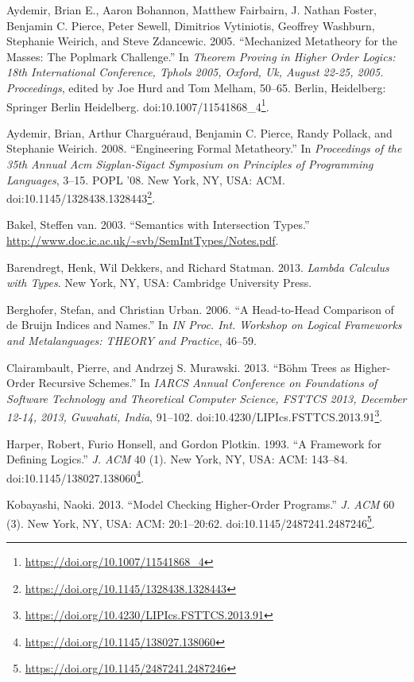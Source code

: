\documentclass[a4paper, 12pt, twoside]{style/ociamthesis}
\theoremstyle{plain}
\theoremstyle{definition}
\theoremstyle{remark}
\renewcommand{\href}[2]{#2\footnote{\url{#1}}}
\begin{document}
\hypertarget{refs}{}
\hypertarget{ref-aydemir05}{}
Aydemir, Brian E., Aaron Bohannon, Matthew Fairbairn, J. Nathan Foster,
Benjamin C. Pierce, Peter Sewell, Dimitrios Vytiniotis, Geoffrey
Washburn, Stephanie Weirich, and Steve Zdancewic. 2005. ``Mechanized
Metatheory for the Masses: The Poplmark Challenge.'' In \emph{Theorem
Proving in Higher Order Logics: 18th International Conference, Tphols
2005, Oxford, Uk, August 22-25, 2005. Proceedings}, edited by Joe Hurd
and Tom Melham, 50--65. Berlin, Heidelberg: Springer Berlin Heidelberg.
doi:\href{https://doi.org/10.1007/11541868_4}{10.1007/11541868\_4}.

\hypertarget{ref-aydemir08}{}
Aydemir, Brian, Arthur Charguéraud, Benjamin C. Pierce, Randy Pollack,
and Stephanie Weirich. 2008. ``Engineering Formal Metatheory.'' In
\emph{Proceedings of the 35th Annual Acm Sigplan-Sigact Symposium on
Principles of Programming Languages}, 3--15. POPL '08. New York, NY,
USA: ACM.
doi:\href{https://doi.org/10.1145/1328438.1328443}{10.1145/1328438.1328443}.

\hypertarget{ref-bakel}{}
Bakel, Steffen van. 2003. ``Semantics with Intersection Types.''
\url{http://www.doc.ic.ac.uk/~svb/SemIntTypes/Notes.pdf}.

\hypertarget{ref-barendregt13}{}
Barendregt, Henk, Wil Dekkers, and Richard Statman. 2013. \emph{Lambda
Calculus with Types}. New York, NY, USA: Cambridge University Press.

\hypertarget{ref-berghofer06}{}
Berghofer, Stefan, and Christian Urban. 2006. ``A Head-to-Head
Comparison of de Bruijn Indices and Names.'' In \emph{IN Proc. Int.
Workshop on Logical Frameworks and Metalanguages: THEORY and Practice},
46--59.

\hypertarget{ref-clairambault13}{}
Clairambault, Pierre, and Andrzej S. Murawski. 2013. ``Böhm Trees as
Higher-Order Recursive Schemes.'' In \emph{IARCS Annual Conference on
Foundations of Software Technology and Theoretical Computer Science,
FSTTCS 2013, December 12-14, 2013, Guwahati, India}, 91--102.
doi:\href{https://doi.org/10.4230/LIPIcs.FSTTCS.2013.91}{10.4230/LIPIcs.FSTTCS.2013.91}.

\hypertarget{ref-harper93}{}
Harper, Robert, Furio Honsell, and Gordon Plotkin. 1993. ``A Framework
for Defining Logics.'' \emph{J. ACM} 40 (1). New York, NY, USA: ACM:
143--84.
doi:\href{https://doi.org/10.1145/138027.138060}{10.1145/138027.138060}.

\hypertarget{ref-kobayashi13}{}
Kobayashi, Naoki. 2013. ``Model Checking Higher-Order Programs.''
\emph{J. ACM} 60 (3). New York, NY, USA: ACM: 20:1--20:62.
doi:\href{https://doi.org/10.1145/2487241.2487246}{10.1145/2487241.2487246}.
\end{document}
